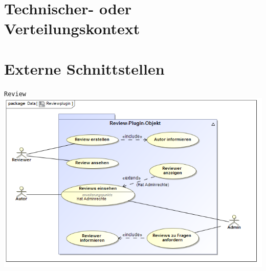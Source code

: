 \documentclass[a4paper]{scrreprt}
\begin{document}
\section{Technischer- oder Verteilungskontext}
\section{Externe Schnittstellen}
\newpage
\texttt{Review}\\

\includegraphics[width=1.0\textwidth]{Use_Case_Diagram__Reviewplugin.png}
\label{Review}
\end{document}
